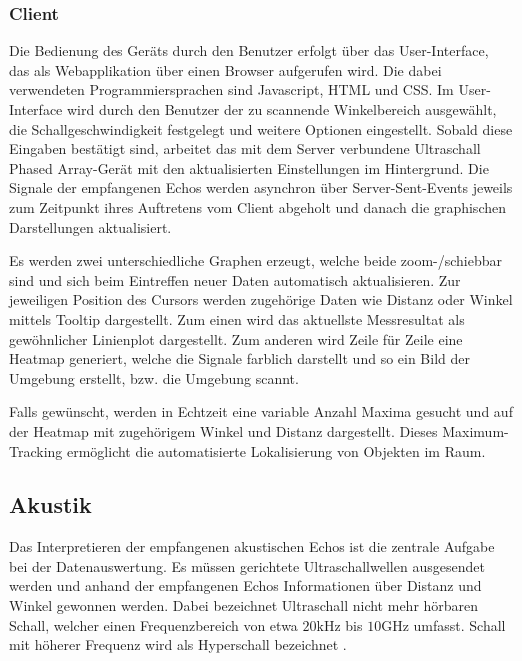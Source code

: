 \subsubsection{Client}\label{sec:client}
Die Bedienung des Geräts durch den Benutzer erfolgt über das User-Interface, das als Webapplikation über einen Browser aufgerufen wird. Die dabei verwendeten Programmiersprachen sind Javascript, HTML und CSS. Im User-Interface wird durch den Benutzer der zu scannende Winkelbereich ausgewählt, die Schallgeschwindigkeit festgelegt und weitere Optionen eingestellt. Sobald diese Eingaben bestätigt sind, arbeitet das mit dem Server verbundene Ultraschall Phased Array-Gerät mit den aktualisierten Einstellungen im Hintergrund. Die Signale der empfangenen Echos werden asynchron über Server-Sent-Events jeweils zum Zeitpunkt ihres Auftretens vom Client abgeholt und danach die graphischen Darstellungen aktualisiert.

Es werden zwei unterschiedliche Graphen erzeugt, welche beide zoom-/schiebbar sind und sich beim Eintreffen neuer Daten automatisch aktualisieren. Zur jeweiligen Position des Cursors werden zugehörige Daten wie Distanz oder Winkel mittels Tooltip dargestellt. Zum einen wird das aktuellste Messresultat als gewöhnlicher Linienplot dargestellt. Zum anderen wird Zeile für Zeile eine Heatmap generiert, welche die Signale farblich darstellt und so ein Bild der Umgebung erstellt, bzw. die Umgebung scannt.

Falls gewünscht, werden in Echtzeit eine variable Anzahl Maxima gesucht und auf der Heatmap mit zugehörigem Winkel und Distanz dargestellt. Dieses Maximum-Tracking ermöglicht die automatisierte Lokalisierung von Objekten im Raum.



\subsection{Akustik}\label{sec:akustik}
Das Interpretieren der empfangenen akustischen Echos ist die zentrale Aufgabe bei der Datenauswertung. Es müssen gerichtete Ultraschallwellen ausgesendet werden und anhand der empfangenen Echos Informationen über Distanz und Winkel gewonnen werden. Dabei bezeichnet Ultraschall nicht mehr hörbaren Schall, welcher einen Frequenzbereich von etwa $20 \mathrm{kHz}$ bis $10 \mathrm{GHz}$ umfasst. Schall mit höherer Frequenz wird als Hyperschall bezeichnet \cite{KOHLRAUSCH}.

